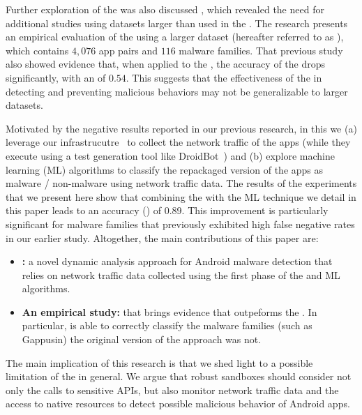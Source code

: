 Further exploration of the \mas was also discussed \pw, which revealed the need for additional studies using datasets larger than used in the \blls. The research presents an empirical evaluation of the \mas using a larger dataset (hereafter referred to as \cds), which contains $4,076$ app pairs and $116$ malware families. That previous study also showed evidence that, when applied to the \cds, the accuracy of the \mas drops significantly, with an \fone of $0.54$. This suggests that the effectiveness of the \mas in detecting and preventing malicious behaviors may not be generalizable to larger datasets. 

Motivated by the negative results reported in our previous research, in this \chap we (a) leverage our
\droidxp infrastrucutre~\cite{DBLP:conf/scam/CostaMCMVBC20} to collect the network traffic of the apps (while they execute using a
test generation tool like DroidBot~\cite{DBLP:conf/icse/LiYGC17}) and (b) explore machine learning (ML) algorithms to classify
the repackaged version of the apps as malware / non-malware using network traffic data. The results
of the experiments that we present here show that combining the \mas with the ML technique we
detail in this paper leads to an accuracy (\fone) of 0.89. This improvement is particularly significant for malware
families that previously exhibited high false negative rates in our earlier study. Altogether, the main
contributions of this paper are:

\begin{itemize}
  \item {\bf \droidxpflow:} a novel dynamic analysis approach for Android malware detection that relies on network traffic data
  collected using the first phase of the \mas and ML algorithms.

  \item {\bf An empirical study:} that brings evidence that \droidxpflow outpeforms the \mas. In particular, \droidxpflow
  is able to correctly classify the malware families (such as Gappusin) the original version of the
  \mas approach was not. 
\end{itemize}

The main implication of this research is that we shed light to
a possible limitation of the \mas in general. We argue that
robust sandboxes should consider not only the calls to
sensitive APIs, but also monitor network traffic data and the
access to native resources to detect possible malicious
behavior of Android apps.

